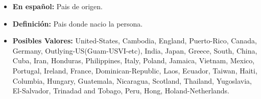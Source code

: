 \documentclass{article}
\begin{document}
\begin{enumerate}
     \begin{itemize}
       \item \textbf{En español:} Pais de origen.
       \item \textbf{Definición:} Pais donde nacio la persona.
       \item \textbf{Posibles Valores:}  United-States, Cambodia, England, Puerto-Rico, Canada, Germany, Outlying-US(Guam-USVI-etc), India, Japan, Greece, South, China, Cuba, Iran, Honduras, Philippines, Italy, Poland, Jamaica, Vietnam, Mexico, Portugal, Ireland, France, Dominican-Republic, Laos, Ecuador, Taiwan, Haiti, Columbia, Hungary, Guatemala, Nicaragua, Scotland, Thailand, Yugoslavia, El-Salvador, Trinadad and Tobago, Peru, Hong, Holand-Netherlands.
     \end{itemize}
   \end{enumerate}
\end{document}
